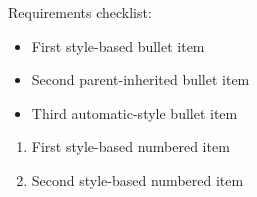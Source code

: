 \documentclass[11pt,a4paper]{article}
\begin{document}
Requirements checklist:

\begin{itemize}
\item First style-based bullet item
\item Second parent-inherited bullet item
\item Third automatic-style bullet item
\end{itemize}

\begin{enumerate}
\item First style-based numbered item
\item Second style-based numbered item
\end{enumerate}
\end{document}
